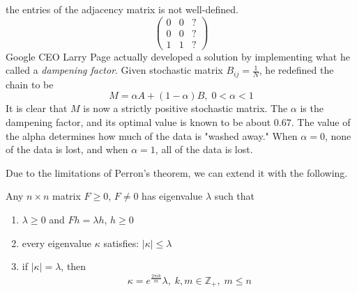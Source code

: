 \documentclass{article}
\newcounter{theorem}[section]
\begin{document}
  \begin{figure}[H]
    \centering 
    \label{fig:degenerate_markov_chain}
  \end{figure}
  the entries of the adjacency matrix is not well-defined. 
  \begin{equation}
     \begin{pmatrix} 0&0&? \\0&0&? \\1&1&?\end{pmatrix}
  \end{equation}
  Google CEO Larry Page actually developed a solution by implementing what he called a \textit{dampening factor}. Given stochastic matrix $B_{i j} = \frac{1}{N}$, he redefined the chain to be 
  \begin{equation}
    M = \alpha A + (1-\alpha) B, \; 0< \alpha < 1
  \end{equation}
  It is clear that $M$ is now a strictly positive stochastic matrix. The $\alpha$ is the dampening factor, and its optimal value is known to be about $0.67$. The value of the alpha determines how much of the data is "washed away." When $\alpha = 0$, none of the data is lost, and when $\alpha = 1$, all of the data is lost. 

  Due to the limitations of Perron's theorem, we can extend it with the following.

  \begin{theorem}
    Any $n \times n$ matrix $F \geq 0$, $F \neq 0$ has eigenvalue $\lambda$ such that
    \begin{enumerate}
      \item $\lambda \geq 0$ and $F h = \lambda h$, $h\geq 0$ \item every eigenvalue $\kappa$ satisfies: $|\kappa| \leq \lambda$ 
      \item if $|\kappa| = \lambda$, then 
      \begin{equation}
        \kappa = e^{\frac{2 \pi i k}{m}} \lambda, \; k, m \in \mathbb{Z}_+, \; m \leq n
      \end{equation}
    \end{enumerate}
  \end{theorem}
\end{document}
